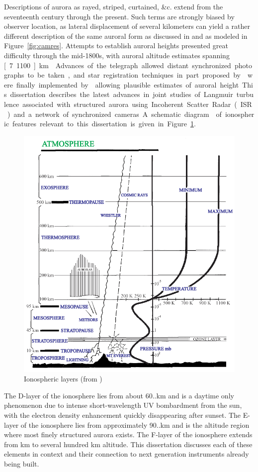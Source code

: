 Descriptions of aurora as rayed, striped, curtained, \&c. extend from the seventeenth century through the present.
Such terms are strongly biased by observer location, as lateral displacement of several kilometers can yield a rather different description of the same auroral form as discussed in \citet{semeter2012} and as modeled in Figure~\ref{fig:camres}.
Attempts to establish auroral heights presented great difficulty through the mid-1800s, with auroral altitude estimates spanning \unit[7..1100]{km} \citep{schwickert1833}.
Advances of the telegraph allowed distant synchronized photographs to be taken, and star registration techniques in part proposed by \citet{schwickert1833} were finally implemented by \citet{stormer1930} allowing plausible estimates of auroral height.

This dissertation describes the latest advances in joint studies of Langmuir turbulence associated with structured aurora using Incoherent Scatter Radar (ISR) and a network of synchronized cameras.
A schematic diagram \citep{schunk2006} of ionospheric features relevant to this dissertation is given in Figure~\ref{fig:aeroiono}.
\begin{figure}\centering
    \includegraphics[width=0.5\linewidth,trim=0 0 340 50,clip]{gfx/aeroiono}
    \caption{Ionospheric layers (from \citet{schunk2006})}\label{fig:aeroiono}
\end{figure}
The D-layer of the ionosphere lies from about 60..\unit[90]{km} and is a daytime only phenomenon due to intense short-wavelength UV bombardment from the sun, with the electron density enhancement quickly disappearing after sunset.
The E-layer of the ionosphere lies from approximately 90..\unit[150]{km} and is the altitude region where most finely structured aurora exists.
The F-layer of the ionosphere extends from \unit[150]{km} to several hundred km altitude. 
This dissertation discusses each of these elements in context and their connection to next generation instruments already being built.
